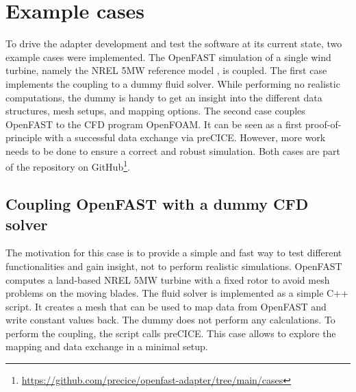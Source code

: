 \section{Example cases}
\label{section:cases}

To drive the adapter development and test the software at its current state, two example cases were implemented. The OpenFAST simulation of a single wind turbine, namely the NREL 5MW reference model \cite{Jonkman:2009}, is coupled. The first case implements the coupling to a dummy fluid solver. While performing no realistic computations, the dummy is handy to get an insight into the different data structures, mesh setups, and mapping options. The second case couples OpenFAST to the CFD program OpenFOAM. It can be seen as a first proof-of-principle with a successful data exchange via preCICE. However, more work needs to be done to ensure a correct and robust simulation. Both cases are part of the repository on GitHub\footnote{\url{https://github.com/precice/openfast-adapter/tree/main/cases}}.

\subsection{Coupling OpenFAST with a dummy CFD solver}
\label{section:cases:dummy}

The motivation for this case is to provide a simple and fast way to test different functionalities and gain insight, not to perform realistic simulations. OpenFAST computes a land-based NREL 5MW turbine with a fixed rotor to avoid mesh problems on the moving blades. The fluid solver is implemented as a simple C++ script. It creates a mesh that can be used to map data from OpenFAST and write constant values back. The dummy does not perform any calculations. To perform the coupling, the script calls preCICE. This case allows to explore the mapping and data exchange in a minimal setup.

